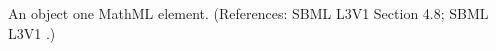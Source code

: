 An \InitialAssignment object  one MathML 
element.  (References: SBML L3V1 Section 4.8; SBML L3V1 .)
